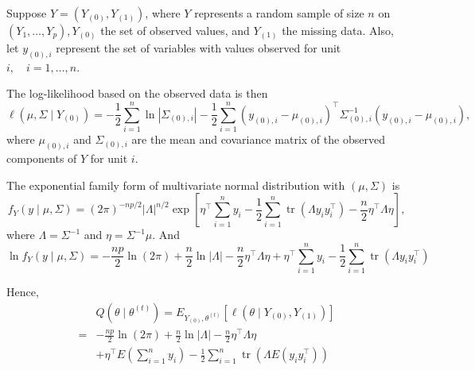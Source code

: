 \begin{example}
	Suppose \(Y=\left(Y_{(0)}, Y_{(1)}\right)\), where \(Y\) represents a random sample of size \(n\) on \(\left(Y_{1}, \ldots, Y_{p}\right), Y_{(0)}\) the set of observed values, and \(Y_{(1)}\) the missing data. Also, let \(y_{(0), i}\) represent the set of variables with values observed for unit \(i, \quad i=1, \ldots, n\).

	The log-likelihood based on the observed data is then
	\begin{equation}
		\ell\left(\mu, \Sigma \mid Y_{(0)}\right)=-\frac{1}{2} \sum_{i=1}^{n} \ln \left|\Sigma_{(0), i}\right|-\frac{1}{2} \sum_{i=1}^{n}\left(y_{(0), i}-\mu_{(0), i}\right)^{\top} \Sigma_{(0), i}^{-1}\left(y_{(0), i}-\mu_{(0), i}\right),
	\end{equation}
	where \(\mu_{(0), i}\) and \(\Sigma_{(0), i}\) are the mean and covariance matrix of the observed components of \(Y\) for unit \(i\).

	The exponential family form of multivariate normal distribution with \(\left(\mu,\Sigma\right)\) is
	\begin{equation}
		f_{Y}(y\mid\mu,\Sigma)=(2\pi)^{-np/2}|\Lambda|^{n/2}\exp\left[\eta^{\top}\sum_{i=1}^{n}y_{i}-\frac{1}{2}\sum_{i=1}^{n}\operatorname{tr}\left(\Lambda y_{i}y_{i}^{\top}\right)-\frac{n}{2}\eta^{\top}\Lambda\eta\right],
	\end{equation}
	where \(\Lambda=\Sigma^{-1}\) and \(\eta=\Sigma^{-1}\mu\). And
	\begin{equation}
		\ln f_{Y}(y\mid\mu,\Sigma)=-\frac{np}{2}\ln(2\pi)+\frac{n}{2}\ln|\Lambda|-\frac{n}{2}\eta^{\top}\Lambda\eta+\eta^{\top}\sum_{i=1}^{n}y_{i}-\frac{1}{2}\sum_{i=1}^{n}\operatorname{tr}\left(\Lambda y_{i}y_{i}^{\top}\right)
	\end{equation}

	Hence,
	\begin{equation}
		\begin{aligned}
			  & Q\left(\theta\mid\theta^{(t)}\right)=E_{Y_{(0)},\theta^{(t)}}\left[\ell\left(\theta\mid Y_{(0)},Y_{(1)}\right)\right]                        \\
			= & -\frac{np}{2}\ln(2\pi)+\frac{n}{2}\ln|\Lambda|-\frac{n}{2}\eta^{\top}\Lambda\eta                                                             \\
			  & +\eta^{\top}E\left(\sum_{i=1}^{n}y_{i}\right)-\frac{1}{2}\sum_{i=1}^{n}\operatorname{tr}\left(\Lambda E\left(y_{i}y_{i}^{\top}\right)\right)
		\end{aligned}
	\end{equation}


\end{example}
